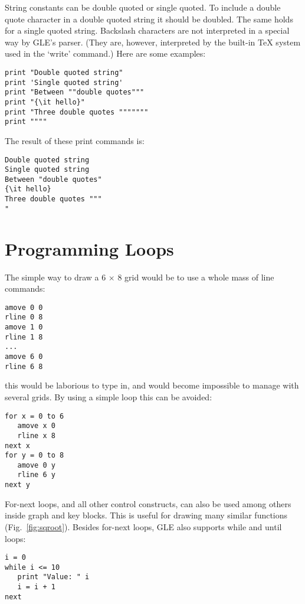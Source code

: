String constants can be double quoted or single quoted. To include a double quote character in a double quoted string it should be doubled. The same holds for a single quoted string. Backslash characters are not interpreted in a special way by GLE's parser. (They are, however, interpreted by the built-in \TeX{} system used in the `{\sf write}' command.) Here are some examples:

\preglecode{}
\begin{Verbatim}
print "Double quoted string"
print 'Single quoted string'
print "Between ""double quotes"""
print "{\it hello}"
print "Three double quotes """""""
print """"
\end{Verbatim}
\postglecode{}

The result of these print commands is:

\preglecode{}
\begin{Verbatim}
Double quoted string
Single quoted string
Between "double quotes"
{\it hello}
Three double quotes """
"
\end{Verbatim}
\postglecode{}

\section{Programming Loops}

The simple way to draw a 6 $\times$ 8 grid would be to use a whole mass 
of line commands:

\preglecode{}
\begin{Verbatim}
amove 0 0 
rline 0 8 
amove 1 0 
rline 1 8 
...
amove 6 0 
rline 6 8
\end{Verbatim}
\postglecode{}

this would be laborious to type in, and would become 
impossible to manage with several grids.  By using a simple loop
this can be avoided:

\preglecode{}
\begin{Verbatim}
for x = 0 to 6
   amove x 0 
   rline x 8 
next x
for y = 0 to 8
   amove 0 y 
   rline 6 y 
next y 
\end{Verbatim}
\postglecode{}

For-next loops, and all other control constructs, can also be used among others inside graph and key blocks. This is useful for drawing many similar functions (Fig.~\ref{fig:sqroot}). Besides for-next loops, GLE also supports while and until loops:

\preglecode{}
\begin{Verbatim}
i = 0
while i <= 10
   print "Value: " i
   i = i + 1
next
\end{Verbatim}
\postglecode{}

